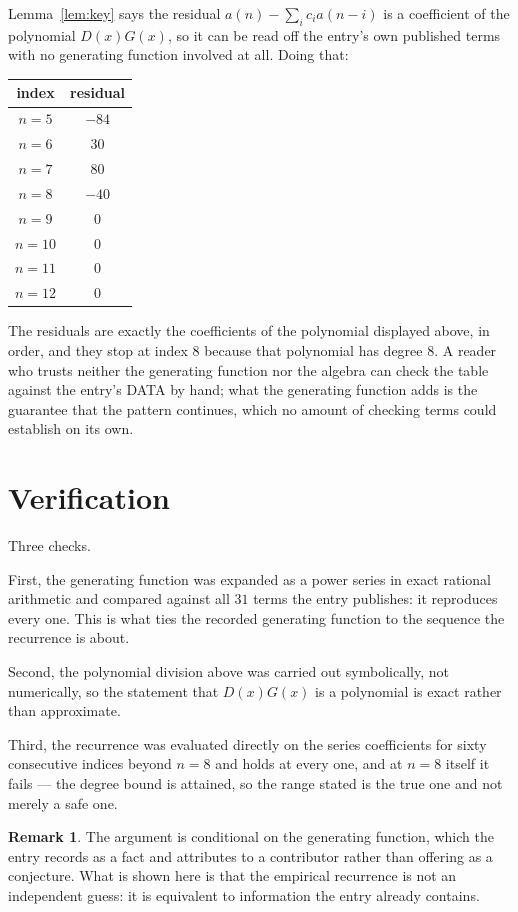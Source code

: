 \documentclass[11pt,a4paper]{article}
\theoremstyle{plain}
\theoremstyle{definition}
\newtheorem{remark}[theorem]{Remark}
\begin{document}
Lemma~\ref{lem:key} says the residual $a(n)-\sum_ic_ia(n-i)$ is a coefficient of the
polynomial $D(x)G(x)$, so it can be read off the entry's own published terms with no
generating function involved at all. Doing that:
\begin{center}
\begin{tabular}{cc}
index & residual \\ \hline
$n=5$ & $-84$ \\
$n=6$ & $30$ \\
$n=7$ & $80$ \\
$n=8$ & $-40$ \\
$n=9$ & $0$ \\
$n=10$ & $0$ \\
$n=11$ & $0$ \\
$n=12$ & $0$
\end{tabular}
\end{center}
The residuals are exactly the coefficients of the polynomial displayed above, in order, and
they stop at index $8$ because that polynomial has degree $8$. A reader who trusts
neither the generating function nor the algebra can check the table against the entry's DATA
by hand; what the generating function adds is the guarantee that the pattern continues, which
no amount of checking terms could establish on its own.

\section{Verification}

Three checks.

First, the generating function was expanded as a power series in exact rational arithmetic and
compared against all $31$ terms the entry publishes: it reproduces every one. This is
what ties the recorded generating function to the sequence the recurrence is about.

Second, the polynomial division above was carried out symbolically, not numerically, so the
statement that $D(x)G(x)$ is a polynomial is exact rather than approximate.

Third, the recurrence was evaluated directly on the series coefficients for sixty consecutive
indices beyond $n=8$ and holds at every one, and at $n=8$ itself it fails --- the
degree bound is attained, so the range stated is the true one and not merely a safe one.

\begin{remark}
The argument is conditional on the generating function, which the entry records as a fact and
attributes to a contributor rather than offering as a conjecture. What is shown here is that
the empirical recurrence is not an independent guess: it is equivalent to information the
entry already contains.
\end{remark}
\end{document}
